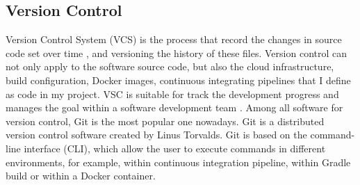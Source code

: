 \subsection{Version Control}
\label{vcs}
Version Control System (VCS) is the process that record the changes in source code set over time \cite{GitAbout93:online}, and versioning the history of these files. 
Version control can not only apply to the software source code, but also the cloud infrastructure, build configuration, Docker images, continuous integrating pipelines that I define as code in my project.
VSC is suitable for track the development progress and manages the goal within a software development team \cite{loeliger2012version}. Among all software for version control, Git is the most popular one nowadays.
Git is a distributed version control software created by Linus Torvalds. Git is based on the command-line interface (CLI), which allow the user to execute commands in different environments, for example, within continuous integration pipeline, within Gradle build or within a Docker container.

